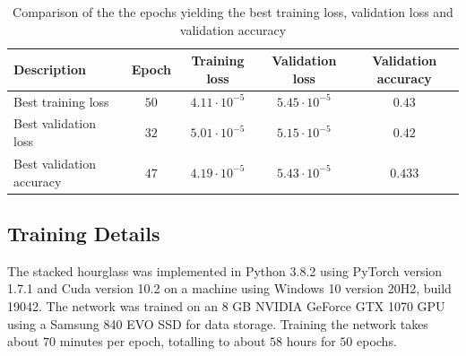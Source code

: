 \documentclass[./main.tex]{subfiles}
\begin{document}
\begin{table}[t]
    \centering
    \begin{tabular}{|l|c|c|c|c|}
        \hline
        \textbf{Description} & \textbf{Epoch} & \textbf{Training loss} & \textbf{Validation loss} & \textbf{Validation accuracy} \\
        \hline
        Best training loss & $50$ & $4.11 \cdot 10^{-5}$ & $5.45 \cdot 10^{-5}$ & $0.43$ \\
        \hline
        Best validation loss & $32$ & $5.01 \cdot 10^{-5}$ & $5.15 \cdot 10^{-5}$ & $0.42$ \\
        \hline
        Best validation accuracy & $47$ & $4.19 \cdot 10^{-5}$ & $5.43 \cdot 10^{-5}$  & $0.433$ \\
        \hline
    \end{tabular}
    \caption{Comparison of the the epochs yielding the best training loss, validation loss and validation accuracy}
    \label{tab:results}
\end{table}

\subsection{Training Details}
The stacked hourglass was implemented in Python 3.8.2 using PyTorch version 1.7.1 and Cuda version 10.2 on a machine using Windows 10 version 20H2, build 19042. The network was trained on an 8 GB NVIDIA GeForce GTX 1070 GPU using a Samsung 840 EVO SSD for data storage. Training the network takes about $70$ minutes per epoch, totalling to about $58$ hours for $50$ epochs.
\end{document}
